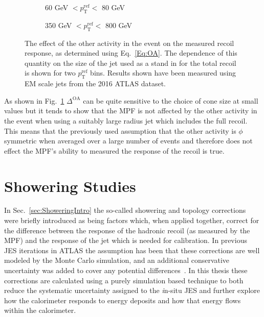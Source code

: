 \begin{figure}[!ht]
  \centering
  \begin{subfigure}{.5\textwidth}
    \centering
    \caption{60 GeV $< p_{\mathrm{T}}^{\mathrm{ref}} < $ 80 GeV}
  \end{subfigure}%
  \begin{subfigure}{.5\textwidth}  \centering
    \caption{350 GeV $< p_{\mathrm{T}}^{\mathrm{ref}} < $ 800 GeV}
  \end{subfigure}
  \caption[$\Delta^{\mathrm{OA}}$ using various cone sizes]
{\small The effect of the other activity in the event on the measured recoil response, as determined using Eq.~\ref{Eq:OA}.  The dependence of this quantity on the size of the jet used as a stand in for the total recoil is shown for two $p_{\mathrm{T}}^{\mathrm {ref}}$ bins.  Results shown have been measured using EM scale jets from the 2016 ATLAS dataset.  }
  \label{Fig:OA_ConeSize}
\end{figure}

As shown in Fig.~\ref{Fig:OA_ConeSize} $\Delta^{\mathrm{OA}}$ can be quite sensitive to the choice of cone size at small values but it tends to show that the MPF is not affected by the other activity in the event when using a suitably large radius jet which includes the full recoil.  
This means that the previously used assumption that the other activity is $\phi$ symmetric when averaged over a large number of events and therefore does not effect the MPF's ability to measured the response of the recoil is true.  



\section{Showering Studies}
\label{Sec:Showering}

In Sec.~\ref{sec:ShoweringIntro} the so-called showering and topology corrections were briefly introduced as being factors which, when applied together, correct for the difference between the response of the hadronic recoil (as measured by the MPF) and the response of the jet which is needed for calibration.  
In previous JES iterations in ATLAS the assumption has been that these corrections are well modeled by the Monte Carlo simulation, and an additional conservative uncertainty was added to cover any potential differences~\cite{ATLAS-CONF-2015-057}.  
In this thesis these corrections are calculated using a purely simulation based technique to both reduce the systematic uncertainty assigned to the {\textit in-situ} JES and further explore how the calorimeter responds to energy deposits and how that energy flows within the calorimeter.  

